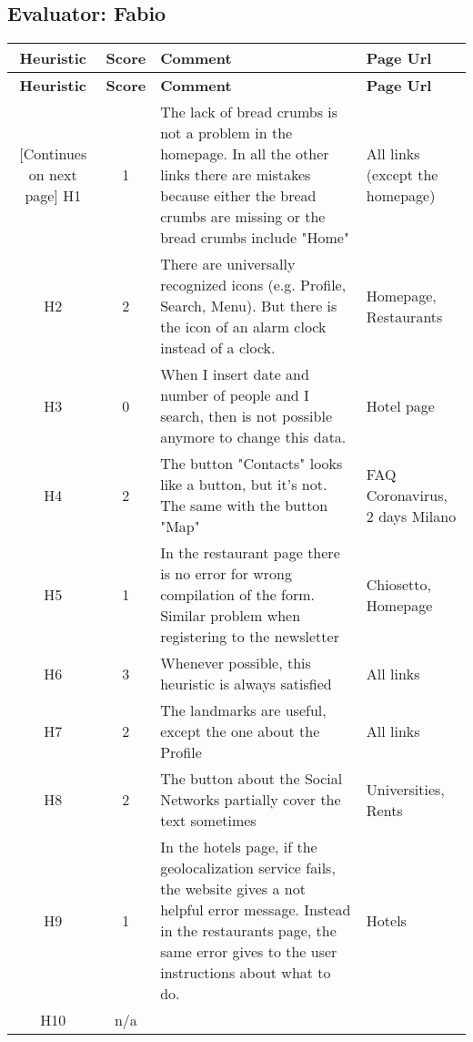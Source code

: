 \begin{small}
\pagebreak

\subsection{Evaluator: Fabio}
\begin{tabularx}{\linewidth}{c c X p{3cm}}
    \textbf{Heuristic} & \textbf{Score} & \textbf{Comment} & \textbf{Page Url}
    \\ \midrule
    \endfirsthead
    \toprule
    \textbf{Heuristic} & \textbf{Score} & \textbf{Comment} & \textbf{Page Url}
    \\ \midrule
    \endhead
    \midrule
    \footnotesize [Continues on next page]
    \endfoot
    \bottomrule
    \endlastfoot
    H1 & 1 & The lack of bread crumbs is not a problem in the homepage.
    In all the other links there are mistakes because either the bread crumbs are missing or the bread crumbs include "Home" & All links (except the homepage)\\ \midrule
    H2 & 2 & There are universally recognized icons (e.g. Profile, Search, Menu). But there is the icon of an alarm clock instead of a clock. & Homepage, Restaurants \\ \midrule
    H3 & 0 & When I insert date and number of people and I search, then is not possible anymore to change this data.& Hotel page\\ \midrule
    H4 & 2 & The button "Contacts" looks like a button, but it's not. The same with the button "Map" & FAQ Coronavirus, 2 days Milano\\ \midrule
    H5 & 1 & In the restaurant page there is no error for wrong compilation of the form. Similar problem when registering to the newsletter& Chiosetto, Homepage\\ \midrule
    H6 & 3 & Whenever possible, this heuristic is always satisfied& All links\\ \midrule
    H7 & 2 & The landmarks are useful, except the one about the Profile & All links\\ \midrule
    H8 & 2 & The button about the Social Networks partially cover the text sometimes & Universities, Rents\\ \midrule
    H9 & 1 & In the hotels page, if the geolocalization service fails, the website gives a not helpful error message. Instead in the restaurants page, the same error gives to the user instructions about what to do. & Hotels \\ \midrule
    H10 & n/a & &
\end{tabularx}
    

\end{small}
